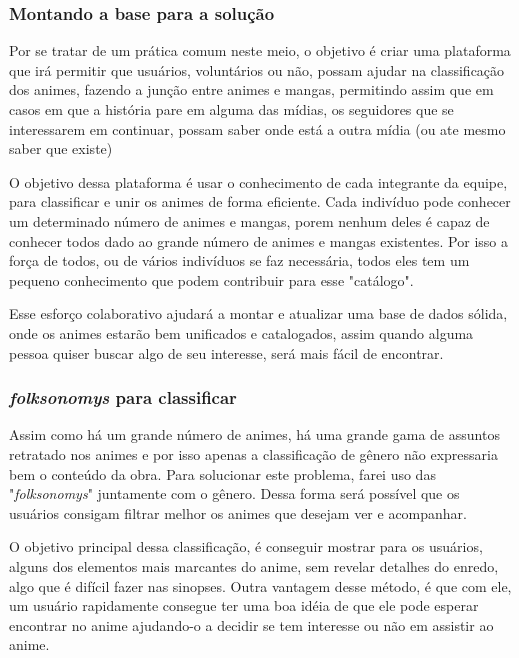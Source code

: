\documentclass[
	12pt,				%
	openright,			%
	twoside,			%
	a4paper,			%
	Times,
	brazil,				%
	]{abntex2}
\begin{document}
\subsubsection{Montando a base para a solução}

Por se tratar de um prática comum neste meio, o objetivo é criar uma plataforma que irá permitir que usuários, voluntários ou não, possam ajudar na classificação dos animes, fazendo a junção entre animes e mangas, permitindo assim que em casos em que a história pare em alguma das mídias, os seguidores que se interessarem em continuar, possam saber onde está a outra mídia (ou ate mesmo saber que existe)
\par

O objetivo dessa plataforma é usar o conhecimento de cada integrante da equipe, para classificar e unir os animes de forma eficiente. Cada indivíduo pode conhecer um determinado número de animes e mangas, porem nenhum deles é capaz de conhecer todos dado ao grande número de animes e mangas existentes. Por isso a força de todos, ou de vários indivíduos se faz necessária, todos eles tem um pequeno conhecimento que podem contribuir para esse "catálogo".
\par

Esse esforço colaborativo ajudará a montar e atualizar uma base de dados sólida, onde os animes estarão bem unificados e catalogados, assim quando alguma pessoa quiser buscar algo de seu interesse, será mais fácil de encontrar.
\par

\subsubsection{\textit{folksonomys} para classificar}

Assim como há um grande número de animes, há uma grande gama de assuntos retratado nos animes e por isso apenas a classificação de gênero não expressaria bem o conteúdo da obra. Para solucionar este problema, farei uso das "\textit{folksonomys}" juntamente com o gênero. Dessa forma será possível que os usuários consigam filtrar melhor os animes que desejam ver e acompanhar. 
\par

O objetivo principal dessa classificação, é conseguir mostrar para os usuários, alguns dos elementos mais marcantes do anime, sem revelar detalhes do enredo, algo que é difícil fazer nas sinopses. Outra vantagem desse método, é que com ele, um usuário rapidamente consegue ter uma boa idéia de que ele pode esperar encontrar no anime ajudando-o a decidir se tem interesse ou não em assistir ao anime. 
\par
\end{document}
